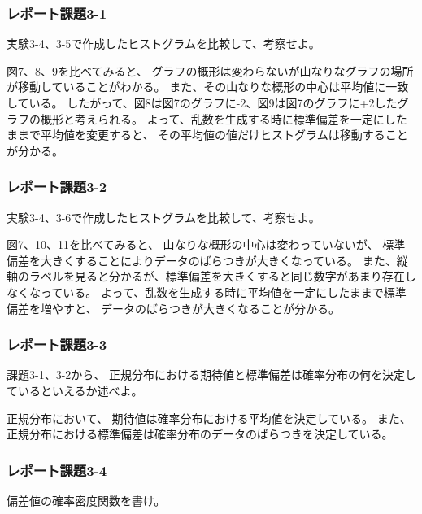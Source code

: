 \documentclass[12pt]{jarticle}
\begin{document}
\subsubsection*{レポート課題3-1}
\begin{shadebox}
    実験3-4、3-5で作成したヒストグラムを比較して、考察せよ。
\end{shadebox}

図7、8、9を比べてみると、
グラフの概形は変わらないが山なりなグラフの場所が移動していることがわかる。
また、その山なりな概形の中心は平均値に一致している。
したがって、図8は図7のグラフに-2、図9は図7のグラフに+2したグラフの概形と考えられる。
よって、乱数を生成する時に標準偏差を一定にしたままで平均値を変更すると、
その平均値の値だけヒストグラムは移動することが分かる。

\subsubsection*{レポート課題3-2}
\begin{shadebox}
    実験3-4、3-6で作成したヒストグラムを比較して、考察せよ。
\end{shadebox}

図7、10、11を比べてみると、
山なりな概形の中心は変わっていないが、
標準偏差を大きくすることによりデータのばらつきが大きくなっている。
また、縦軸のラベルを見ると分かるが、標準偏差を大きくすると同じ数字があまり存在しなくなっている。
よって、乱数を生成する時に平均値を一定にしたままで標準偏差を増やすと、
データのばらつきが大きくなることが分かる。

\subsubsection*{レポート課題3-3}
\begin{shadebox}
    課題3-1、3-2から、
    正規分布における期待値と標準偏差は確率分布の何を決定しているといえるか述べよ。
\end{shadebox}

正規分布において、
期待値は確率分布における平均値を決定している。
また、正規分布における標準偏差は確率分布のデータのばらつきを決定している。

\subsubsection*{レポート課題3-4}
\begin{shadebox}
    偏差値の確率密度関数を書け。
\end{shadebox}
\end{document}
